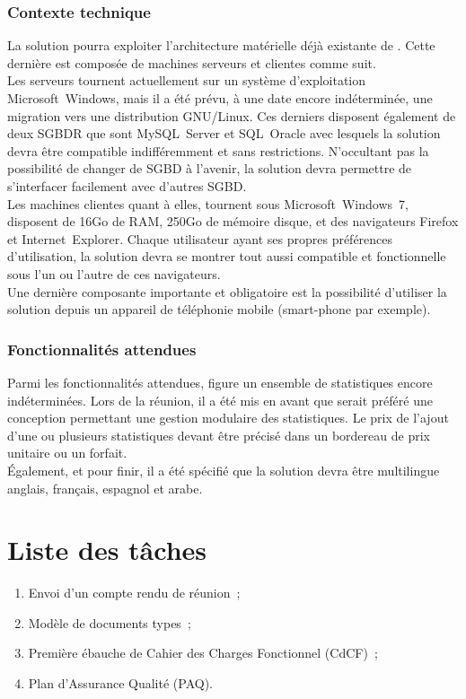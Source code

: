 \documentclass[11pt,fleqn]{report}
\begin{document}
\subsubsection{Contexte technique}
La solution pourra exploiter l'architecture matérielle déjà existante de \mo. Cette dernière est composée de machines serveurs et clientes comme suit.
\\
Les serveurs tournent actuellement sur un système d'exploitation Microsoft~Windows, mais il a été prévu, à une date encore indéterminée, une migration vers une distribution GNU/Linux. Ces derniers disposent également de deux SGBDR que sont MySQL~Server et SQL~Oracle avec lesquels la solution devra être compatible indifféremment et sans restrictions. N'occultant pas la possibilité de changer de SGBD à l'avenir, la solution devra permettre de s'interfacer facilement avec d'autres SGBD.
\\
Les machines clientes quant à elles, tournent sous Microsoft~Windows~7, disposent de 16Go de RAM, 250Go de mémoire disque, et des navigateurs Firefox et Internet~Explorer. Chaque utilisateur ayant ses propres préférences d'utilisation, la solution devra se montrer tout aussi compatible et fonctionnelle sous l'un ou l'autre de ces navigateurs.
\\
Une dernière composante importante et obligatoire est la possibilité d'utiliser la solution depuis un appareil de téléphonie mobile (smart-phone par exemple).

\subsubsection{Fonctionnalités attendues}
Parmi les fonctionnalités attendues, figure un ensemble de statistiques encore indéterminées. Lors de la réunion, il a été mis en avant que serait préféré une conception permettant une gestion modulaire des statistiques. Le prix de l'ajout d'une ou plusieurs statistiques devant être précisé dans un bordereau de prix unitaire ou un forfait.
\\
Également, et pour finir, il a été spécifié que la solution devra être multilingue anglais, français, espagnol et arabe.

\section{Liste des tâches}
\begin{enumerate}
	\item Envoi d'un compte rendu de réunion~;
	\item Modèle de documents types~;
	\item Première ébauche de Cahier des Charges Fonctionnel (CdCF)~;
	\item Plan d'Assurance Qualité (PAQ).
\end{enumerate}
\end{document}

